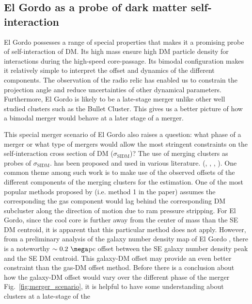 \subsection{El Gordo as a probe of dark matter self-interaction}
El Gordo possesses a range of special properties that makes it a promising
probe of self-interaction of DM. Its high mass ensure high DM
particle density for interactions during the high-speed core-passage. Its bimodal configuration makes it
relatively simple to interpret the offset and dynamics of the different
components. The observation of the radio relic has enabled us to
constrain the projection angle and reduce uncertainties of other dynamical
parameters. Furthermore, El Gordo is likely to be a late-stage merger
unlike other well studied clusters such as the Bullet Cluster. This gives
us a better picture of how a bimodal merger would behave at a later stage of a merger. \par 
This special merger scenario of El Gordo also raises a question: what phase
of a merger or what type of mergers would allow the most stringent
constraints on the self-interaction cross section of DM ($\sigma_{\text{SIDM}}$)? 
The use of merging clusters as probes of $\sigma_{\text{SIDM}}$. 
has been proposed and used in various literature.
(\citealt{Markevitch2004}, \citealt{Randall2008d}, \citealt{Merten2011},
\citealt{Dawson12}). One common theme among such work is
to make use of the observed offsets of the different components of the
merging clusters for the estimation. One of the most popular methods proposed by
\citealt{Markevitch2004} (i.e. method 1 in the paper) assumes the
corresponding the gas component would lag behind the corresponding DM
subcluster along the direction of motion due to ram pressure stripping.   
For El Gordo, since the cool core is further away from the
center of mass than the SE DM centroid, it is apparent that this particular
method does not apply. However, from a preliminary analysis of
the galaxy number density map of El Gordo , there is a
noteworthy $\sim0.2~\mega$pc offset between the SE galaxy number density
peak and the SE DM centroid. This galaxy-DM offset may provide an even
better constraint than the gas-DM offset method. Before there is a
conclusion about how the galaxy-DM offset would vary over
the different phase of the merger Fig.~\ref{fig:merger_scenario}, it is
helpful to have some understanding about clusters at a late-stage of the
